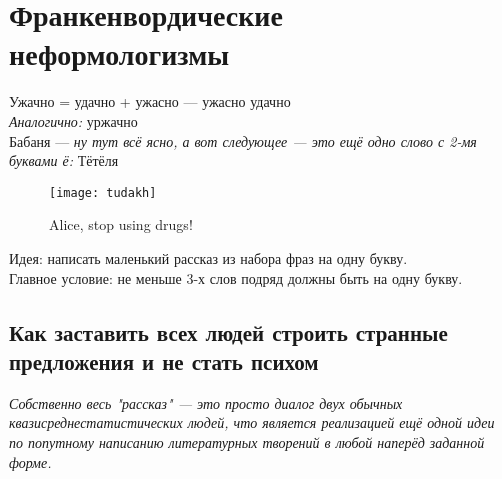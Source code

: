 \section{Франкенвордические неформологизмы}

Ужачно = удачно + ужасно --- ужасно удачно\\

\emph{Аналогично:} уржачно\\

Бабаня --- \emph{ну тут всё ясно, а вот следующее --- это ещё одно слово с 2-мя буквами ё:} Тётёля

\begin{figure}[ht!]
    \centering
    \texttt{[image: tudakh]}
    \caption{Alice, stop using drugs!}
\end{figure}

Идея: написать маленький рассказ из набора фраз на одну букву.\\
Главное условие: не меньше 3-х слов подряд должны быть на одну букву.

\subsection{Как заставить всех людей строить странные предложения и не стать психом}
\emph{Собственно весь "рассказ" --- это просто диалог двух обычных квазисреднестатистических людей, что является реализацией ещё одной идеи по попутному написанию литературных творений в любой наперёд заданной форме.}

